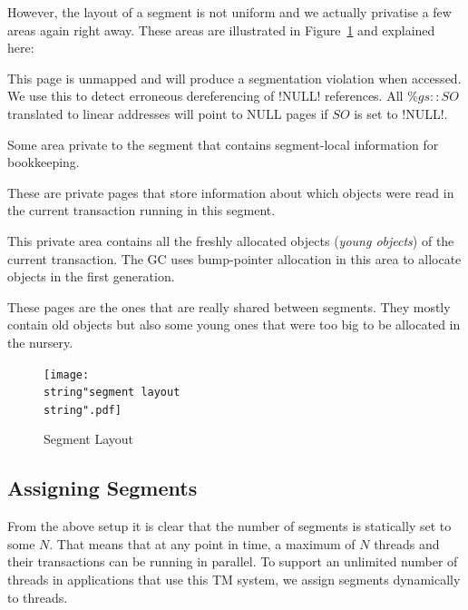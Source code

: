 \documentclass{sigplanconf}
\makeatletter
\renewcommand\lstinline[1][]{%
  \Collectverb{\@@myverb}%
}
\def\@@myverb#1{%
    \begingroup
    \fboxsep=0.2em
    \colorbox{verylightgray}{\oldlstinline|#1|}%
    \endgroup
}
\makeatother
\begin{document}
However, the layout of a segment is not uniform and we actually
privatise a few areas again right away. These areas are illustrated in
Figure~\ref{fig:Segment-Layout} and explained here:
\begin{description}[noitemsep]
\item [{NULL~page:}] This page is unmapped and will produce a
  segmentation violation when accessed. We use this to detect
  erroneous dereferencing of \lstinline!NULL! references.  All
  $\%gs{::}SO$ translated to linear addresses will point to NULL pages
  if $SO$ is set to \lstinline!NULL!.
\item [{Segment-local~data:}] Some area private to the segment that
  contains segment-local information for bookkeeping.
\item [{Read~markers:}] These are private pages that store information about
  which objects were read in the current transaction running in this
  segment.
\item [{Nursery:}] This private area contains all the freshly allocated
  objects (\emph{young objects}) of the current transaction. The GC
  uses bump-pointer allocation in this area to allocate objects in the
  first generation.
\item [{Old~object~space:}] These pages are the ones that are really
  shared between segments. They mostly contain old objects but also
  some young ones that were too big to be allocated in the nursery.
\end{description}



\begin{figure}[t]
  \centering
  \texttt{[image: \\string"segment layout\\string".pdf]}
  \caption{Segment Layout\label{fig:Segment-Layout}}
\end{figure}



\subsection{Assigning Segments}

From the above setup it is clear that the number of segments is
statically set to some $N$. That means that at any point in time, a
maximum of $N$ threads and their transactions can be running in
parallel.  To support an unlimited number of threads in applications
that use this TM system, we assign segments dynamically to threads.
\end{document}
